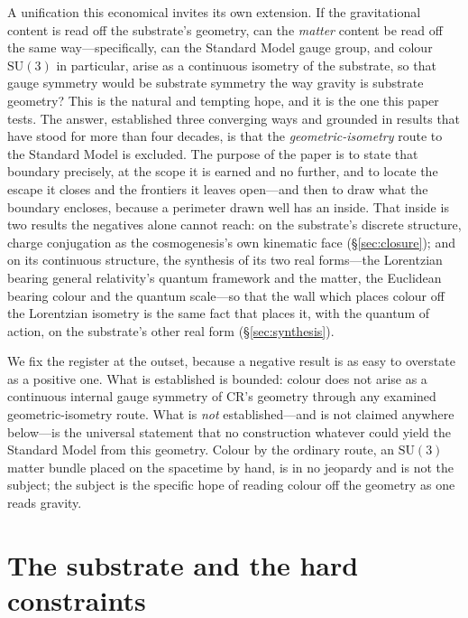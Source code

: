 \documentclass[11pt]{article}
\theoremstyle{plain}
\theoremstyle{remark}
\newcommand{\SU}{\mathrm{SU}}
\begin{document}
A unification this economical invites its own extension. If the gravitational content is read off the substrate's geometry, can the \emph{matter} content be read off the same way---specifically, can the Standard Model gauge group, and colour $\SU(3)$ in particular, arise as a continuous isometry of the substrate, so that gauge symmetry would be substrate symmetry the way gravity is substrate geometry? This is the natural and tempting hope, and it is the one this paper tests. The answer, established three converging ways and grounded in results that have stood for more than four decades, is that the \emph{geometric-isometry} route to the Standard Model is excluded. The purpose of the paper is to state that boundary precisely, at the scope it is earned and no further, and to locate the escape it closes and the frontiers it leaves open---and then to draw what the boundary encloses, because a perimeter drawn well has an inside. That inside is two results the negatives alone cannot reach: on the substrate's discrete structure, charge conjugation as the cosmogenesis's own kinematic face (\S\ref{sec:closure}); and on its continuous structure, the synthesis of its two real forms---the Lorentzian bearing general relativity's quantum framework and the matter, the Euclidean bearing colour and the quantum scale---so that the wall which places colour off the Lorentzian isometry is the same fact that places it, with the quantum of action, on the substrate's other real form (\S\ref{sec:synthesis}).

We fix the register at the outset, because a negative result is as easy to overstate as a positive one. What is established is bounded: colour does not arise as a continuous internal gauge symmetry of CR's geometry through any examined geometric-isometry route. What is \emph{not} established---and is not claimed anywhere below---is the universal statement that no construction whatever could yield the Standard Model from this geometry. Colour by the ordinary route, an $\SU(3)$ matter bundle placed on the spacetime by hand, is in no jeopardy and is not the subject; the subject is the specific hope of reading colour off the geometry as one reads gravity.

\section{The substrate and the hard constraints}\label{sec:setup}
\end{document}
